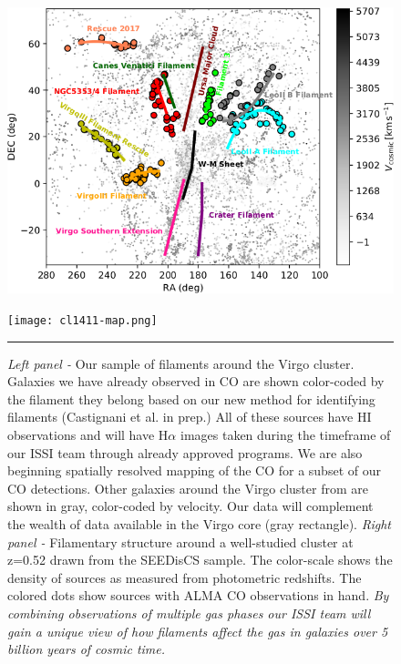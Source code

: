 \documentclass[11pt]{article}
\begin{document}
\begin{figure}[t!]
\vspace{-1cm}
\begin{minipage}{.5\textwidth}
  \centering
  \includegraphics[width=1.0\linewidth]{plot_ISSI2.png}
\end{minipage}%
\begin{minipage}{.5\textwidth}
  \centering
  \texttt{[image: cl1411-map.png]}
\end{minipage}
\vspace{-0.5cm}
\caption{\small{{\it Left panel - } Our sample of filaments around the Virgo cluster.  Galaxies we have already observed in CO are shown color-coded by the filament they belong based on our new method for identifying filaments (Castignani et al. in prep.)  All of these sources have HI observations and will have H$\alpha$ images taken during the timeframe of our ISSI team through already approved programs.  We are also beginning spatially resolved mapping of the CO for a subset of our CO detections.  Other galaxies around the Virgo cluster from \citet{Kim16} are shown in gray, color-coded by velocity.  Our data will complement the wealth of data available in the Virgo core (gray rectangle). {\it Right panel - } Filamentary structure around a well-studied cluster at z=0.52 drawn from the SEEDisCS sample.  The color-scale shows the density of sources as measured from photometric redshifts.  
The colored dots show sources with ALMA CO observations in hand.  \textit{By combining observations of multiple gas phases our ISSI team will gain a unique view of how filaments affect the gas in galaxies over 5 billion years of cosmic time.}}}
\label{fig:Fig1}
\vspace{0.2cm}
\hrule
\vspace{-0.5cm}
\end{figure}
\end{document}
